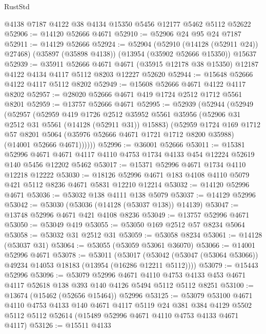 \begin{lexlean}{RustStd}
\begin{coremodule}
    @4138
    @7187
    @4122
    @38
    @4134
    @15350
    @5456
    @12177
    @5462
    @5112
    @52622
@52906 := @14120 @52666 @4671
@52910 := @52906 @24 @95 @24 @7187
@52911 := @14129 @52666
@52924 := @52904
    (@52910 (@14128 (@52911 @24)) @27468)
    (@35897 (@35898 @4138))
    (@13954 (@35902 @52666 @15350))
    @15637
@52939 := @35911
    @52666
    @4671
    @4671
    (@35915 @12178 @38 @15350)
    @12187
    @4122
    @4134
    @4117
    @5112
    @8203
    @12227
    @52620
@52944 := @15648 @52666 @4122 @4117 @5112 @8202
@52949 := @15608 @52666 @4671 @4122 @4117 @8202
@52957 := @28020 @52666 @4671 @419 @1724 @2512 @1712 @5561 @8201
@52959 := @13757 @52666 @4671
@52995 := @52939
    (@52944
      (@52949
        (@52957
          (@52959
            @419
            @1726
            @2512
            @35952
            @5561
            @35956
            (@52906 @31 @2512 @31 @5561 (@14128 (@52911 @31)) @15883)
            (@52959
              @1724
              @169
              @1712
              @57
              @8201
              @5064
              (@35976 @52666 @4671 @1721 @1712 @8200 @35988)
              (@14001 @52666 @4671))))))
@52996 := @36001 @52666
@53011 := @15381
    @52996
    @4671
    @4671
    @4117
    @4110
    @4753
    @1734
    @4133
    @454
    @12224
    @52619
    @140
    @5456
    @12202
    @5462
@53017 := @15371 @52996 @4671 @1734 @4110 @12218 @12222
@53030 := @18126 @52996 @4671 @183 @4108 @4110 @5079 @421 @5112 @8236 @4671 @5831 @12210 @12214
@53032 := @14120 @52996 @4671
@53036 := @53032 @138 @4111 @138 @5079
@53037 := @14129 @52996
@53042 := @53030 (@53036 (@14128 (@53037 @138)) @14139)
@53047 := @13748 @52996 @4671 @421 @4108 @8236
@53049 := @13757 @52996 @4671
@53050 := @53049 @419
@53055 := @53050 @169 @2512 @57 @8234 @5064
@53058 := @53032 @31 @2512 @31
@53059 := @53058 @8234
@53061 := @14128 (@53037 @31)
@53064 := @53055 (@53059 @53061 @36070)
@53066 := @14001 @52996 @4671
@53078 := @53011
    (@53017 (@53042 (@53047 (@53064 @53066)) @49234 @14053 @18183 (@13954 (@16286 @12211 @5112))))
@53079 := @15443 @52996
@53096 := @53079
    @52996
    @4671
    @4110
    @4753
    @4133
    @453
    @4671
    @4117
    @52618
    @138
    @393
    @140
    @4126
    @5494
    @5112
    @5112
    @8251
@53100 := @13674 (@15462 (@52656 @15464)) @52996
@53125 := @53079
    @53100
    @4671
    @4110
    @4753
    @4133
    @140
    @4671
    @4117
    @5119
    @24
    @381
    @384
    @4129
    @5502
    @5112
    @5112
    @52614
    (@15489 @52996 @4671 @4110 @4753 @4133 @4671 @4117)
@53126 := @15511 @4133

\end{coremodule}
\end{lexlean}
